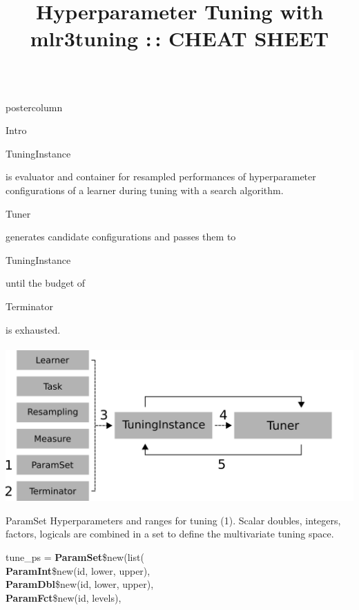 \documentclass{beamer}
\title{Hyperparameter Tuning with mlr3tuning :\,: CHEAT SHEET} %
\newlength{\columnheight} %
\newcommand{\codeinline}[1]{\begin{codeboxinline}#1\end{codeboxinline}}
\begin{document}
\begin{frame}[fragile]{}
	\begin{columns}
		\begin{column}{.245\textwidth}
			\begin{beamercolorbox}[center]{postercolumn}
				\begin{minipage}{.98\textwidth}
					\parbox[t][\columnheight]{\textwidth}{
						\begin{myblock}{Intro}
							\codeinline{TuningInstance} is evaluator and container for resampled performances of hyperparameter configurations of a learner during tuning with a search algorithm. 
                            \codeinline{Tuner} generates candidate configurations and passes them to \codeinline{TuningInstance} until the budget of \codeinline{Terminator} is exhausted. 
                            \\
							\vspace{1em}
							\\
                            \includegraphics[width=\textwidth]{img/tuning_objects.png}
						\end{myblock}
						\begin{myblock}{ParamSet}
					        Hyperparameters and ranges for tuning (1). Scalar doubles, integers, 
                            factors, logicals are combined in a set to define the multivariate tuning space.
							\\
							\begin{codeboxmultiline}[width=21cm]
								tune\_ps = \textbf{ParamSet}\$new(list(\\
								\hspace*{1ex}\textbf{ParamInt}\$new(id, lower, upper),\\
								\hspace*{1ex}\textbf{ParamDbl}\$new(id, lower, upper),\\
								\hspace*{1ex}\textbf{ParamFct}\$new(id, levels),\\

\end{codeboxmultiline}
\end{myblock}}
\end{minipage}
\end{beamercolorbox}
\end{column}
\end{columns}
\end{frame}
\end{document}
